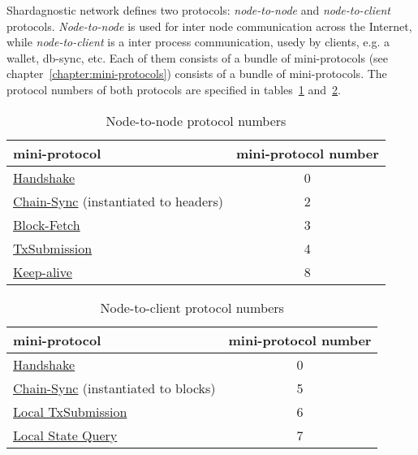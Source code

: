 Shardagnostic network defines two protocols: \emph{node-to-node} and
\emph{node-to-client} protocols.  \emph{Node-to-node} is used for inter node
communication across the Internet, while \emph{node-to-client} is a inter
process communication, usedy by clients, e.g. a wallet, db-sync, etc.  Each of them consists of a bundle of mini-protocols (see chapter~\ref{chapter:mini-protocols})
consists of a bundle of mini-protocols.  The protocol numbers of both protocols
are specified in tables~\ref{table:node-to-node-protocol-numbers}
and~\ref{table:node-to-client-protocol-numbers}.
\begin{table}[ht]
  \begin{center}
    \begin{tabular}{l|c}
      mini-protocol                                                      & mini-protocol number \\\hline
      \hyperref[handshake-protocol]{Handshake}                           & 0  \\
      \hyperref[chain-sync-protocol]{Chain-Sync} \small{(instantiated to headers)} & 2  \\
      \hyperref[block-fetch-protocol]{Block-Fetch}                       & 3  \\
      \hyperref[tx-submission-protocol]{TxSubmission}                    & 4  \\
      \hyperref[keep-alive-protocol]{Keep-alive}                         & 8  \\
    \end{tabular}
  \end{center}
  \caption{Node-to-node protocol numbers}
  \label{table:node-to-node-protocol-numbers}
\end{table}
\begin{table}[ht]
  \begin{center}
    \begin{tabular}{l|c}
      mini-protocol                                                     & mini-protocol number \\\hline
      \hyperref[handshake-protocol]{Handshake}                          & 0 \\
      \hyperref[chain-sync-protocol]{Chain-Sync} \small{(instantiated to blocks)} & 5 \\
      \hyperref[local-tx-submission-protocol]{Local TxSubmission}       & 6 \\
      \hyperref[local-state-query-protocol]{Local State Query}          & 7 \\
    \end{tabular}
  \end{center}
  \caption{Node-to-client protocol numbers}
  \label{table:node-to-client-protocol-numbers}
\end{table}
